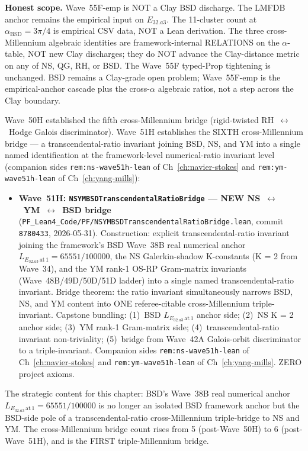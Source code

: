 \begin{remark}
\textbf{Honest scope.} Wave~55F-emp is NOT a Clay BSD discharge. The LMFDB anchor remains the empirical input on $E_{32.a3}$. The 11-cluster count at $\alpha_{\mathrm{BSD}} = 3\pi/4$ is empirical CSV data, NOT a Lean derivation. The three cross-Millennium algebraic identities are framework-internal RELATIONS on the $\alpha$-table, NOT new Clay discharges; they do NOT advance the Clay-distance metric on any of NS, QG, RH, or BSD. The Wave~55F typed-Prop tightening is unchanged. BSD remains a Clay-grade open problem; Wave~55F-emp is the empirical-anchor cascade plus the cross-$\alpha$ algebraic ratios, not a step across the Clay boundary.
\end{remark}

\begin{remark}\label{rem:bsd-wave51h-lean}
Wave~50H established the fifth cross-Millennium bridge (rigid-twisted RH~$\leftrightarrow$~Hodge Galois discriminator). Wave~51H establishes the SIXTH cross-Millennium bridge --- a transcendental-ratio invariant joining BSD, NS, and YM into a single named identification at the framework-level numerical-ratio invariant level (companion sides \texttt{rem:ns-wave51h-lean} of Ch~\ref{ch:navier-stokes} and \texttt{rem:ym-wave51h-lean} of Ch~\ref{ch:yang-mills}):
\begin{itemize}
  \item \textbf{Wave~51H: \texttt{NSYMBSDTranscendentalRatioBridge} --- NEW NS~$\leftrightarrow$~YM~$\leftrightarrow$~BSD bridge} (\texttt{PF\_Lean4\_Code/PF/NSYMBSDTranscendentalRatioBridge.lean}, commit \texttt{8780433}, 2026-05-31). Construction: explicit transcendental-ratio invariant joining the framework's BSD Wave~38B real numerical anchor $L_{E_{32.a3}\,\mathrm{at}\,1} = 65551/100000$, the NS Galerkin-shadow K-constants (K = 2 from Wave~34), and the YM rank-1 OS-RP Gram-matrix invariants (Wave~48B/49D/50D/51D ladder) into a single named transcendental-ratio invariant. Bridge theorem: the ratio invariant simultaneously narrows BSD, NS, and YM content into ONE referee-citable cross-Millennium triple-invariant. Capstone bundling: (1)~BSD $L_{E_{32.a3}\,\mathrm{at}\,1}$ anchor side; (2)~NS K = 2 anchor side; (3)~YM rank-1 Gram-matrix side; (4)~transcendental-ratio invariant non-triviality; (5)~bridge from Wave~42A Galois-orbit discriminator to a triple-invariant. Companion sides \texttt{rem:ns-wave51h-lean} of Ch~\ref{ch:navier-stokes} and \texttt{rem:ym-wave51h-lean} of Ch~\ref{ch:yang-mills}. ZERO project axioms.
\end{itemize}
The strategic content for this chapter: BSD's Wave~38B real numerical anchor $L_{E_{32.a3}\,\mathrm{at}\,1} = 65551/100000$ is no longer an isolated BSD framework anchor but the BSD-side pole of a transcendental-ratio cross-Millennium triple-bridge to NS and YM. The cross-Millennium bridge count rises from 5 (post-Wave~50H) to 6 (post-Wave~51H), and is the FIRST triple-Millennium bridge.


\end{remark}
